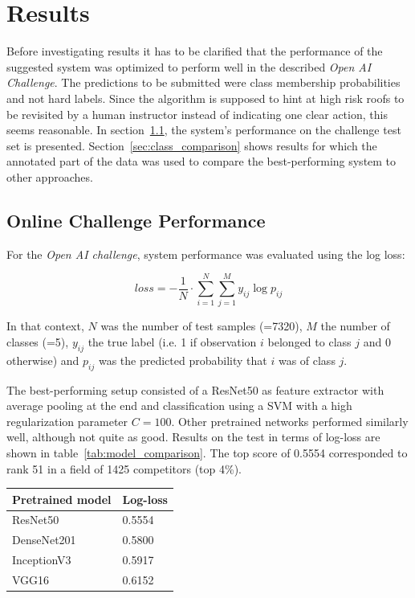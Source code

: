 \documentclass[11pt]{article}
\begin{document}
	\section{Results}
	
	Before investigating results it has to be clarified that the performance of the suggested system was optimized to perform well in the described \textit{Open AI Challenge}. The predictions to be submitted were class membership probabilities and not hard labels. Since the algorithm is supposed to hint at high risk roofs to be revisited by a human instructor instead of indicating one clear action, this seems reasonable. In section~\ref{sec:challenge_perf}, the system's performance on the challenge test set is presented. Section~\ref{sec:class_comparison} shows results for which the annotated part of the data was used to compare the best-performing system to other approaches.
	
	\subsection{Online Challenge Performance}
	\label{sec:challenge_perf}
	
	For the \textit{Open AI challenge}, system performance was evaluated using the log loss:
	
	\begin{equation}
		loss = -\frac{1}{N}\cdot \sum_{i=1}^{N} \sum_{j=1}^{M}y_{ij}\log p_{ij}
		\label{eq:log_loss}
	\end{equation}
	
	In that context, $N$ was the number of test samples (=7320), $M$ the number of classes (=5), $y_{ij}$ the true label (i.e. 1 if observation $i$ belonged to class $j$ and 0 otherwise) and $p_{ij}$ was the predicted probability that $i$ was of class $j$. 
	
	The best-performing setup consisted of a ResNet50 as feature extractor with average pooling at the end and classification using a SVM with a high regularization parameter $C=100$.
	Other pretrained networks performed similarly well, although not quite as good. Results on the test in terms of log-loss are shown in table~\ref{tab:model_comparison}.
	The top score of 0.5554 corresponded to rank 51 in a field of 1425 competitors (top 4\%).
	
	\begin{center}
		\bgroup
		\def\arraystretch{1.1}
		\begin{tabular}{ | m{4cm} | m{2cm} | } 
			
			\hline
			Pretrained model & Log-loss \\
			\hline
			\hline
			ResNet50 & 0.5554 \\
			\hline
			DenseNet201 & 0.5800\\
			\hline
			InceptionV3 & 0.5917\\
			\hline
			VGG16 & 0.6152\\
			\hline
		\end{tabular}
		\egroup
		\label{tab:model_comparison}
	\end{center}
	
\end{document}
